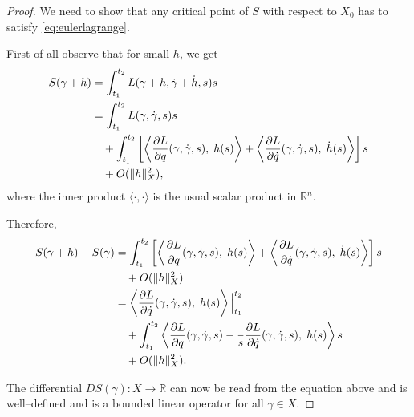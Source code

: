 \documentclass[english,fontsize=11pt,paper=a5,oneside]{scrbook}
\newcommand{\R}{\mathbb{R}}
\newcommand{\lag}{\langle}
\newcommand{\rag}{\rangle}
\let\d\relax
\newcommand{\d}{\mathrm{d}}
\theoremstyle{definition}
\begin{document}
\begin{proof}
  We need to show that any critical point of $S$ with respect to $X_0$ has to satisfy \eqref{eq:eulerlagrange}.

  First of all observe that for small $h$, we get
  \begin{equation}
    \begin{split}
      S(\gamma + h) &= \int_{t_1}^{t_2} L(\gamma + h, \dot \gamma + \dot h, s) \d s \\
      &= \int_{t_1}^{t_2} %
      L(\gamma, \dot \gamma, s) \d s \\
      &\quad + \int_{t_1}^{t_2} \left[
        \left\lag
        \frac{\partial L}{\partial q}(\gamma, \dot \gamma, s),\;
        h(s)
        \right\rag
        + \left\lag
        \frac{\partial L}{\partial \dot q}(\gamma, \dot \gamma, s),\;
        \dot h(s)
        \right\rag
        \right] \d s \\
      &\quad + O(\|h\|^2_X),
    \end{split}
  \end{equation}
  where the inner product $\lag\cdot,\cdot\rag$ is the usual scalar product in $\R^n$.

  Therefore,
  \begin{equation}
    \begin{split}
      S(\gamma+h) - S(\gamma) &= \int_{t_1}^{t_2} \left[
        \left\lag\frac{\partial L}{\partial q}(\gamma, \dot \gamma, s),\; h(s)\right\rag
        + \left\lag\frac{\partial L}{\partial \dot q}(\gamma, \dot \gamma, s),\; \dot h(s)\right\rag
        \right] \d s\\
      &\quad + O(\|h\|^2_X)\\
      &= \left\lag\frac{\partial L}{\partial \dot q}(\gamma, \dot \gamma, s),\; h(s)\right\rag \Big|_{t_1}^{t_2} \\
      &\quad + \int_{t_1}^{t_2} \left\lag
      \frac{\partial L}{\partial q}(\gamma, \dot \gamma, s)
      - \frac{\d}{\d s}\frac{\partial L}{\partial \dot q}(\gamma, \dot \gamma, s)
      ,\; h(s)\right\rag \d s\\
      &\quad + O(\|h\|^2_X).
    \end{split}
  \end{equation}

  The differential $DS(\gamma): X \to \R$ can now be read from the equation above and is well--defined and is a bounded linear operator for all $\gamma\in X$.


\end{proof}
\end{document}
